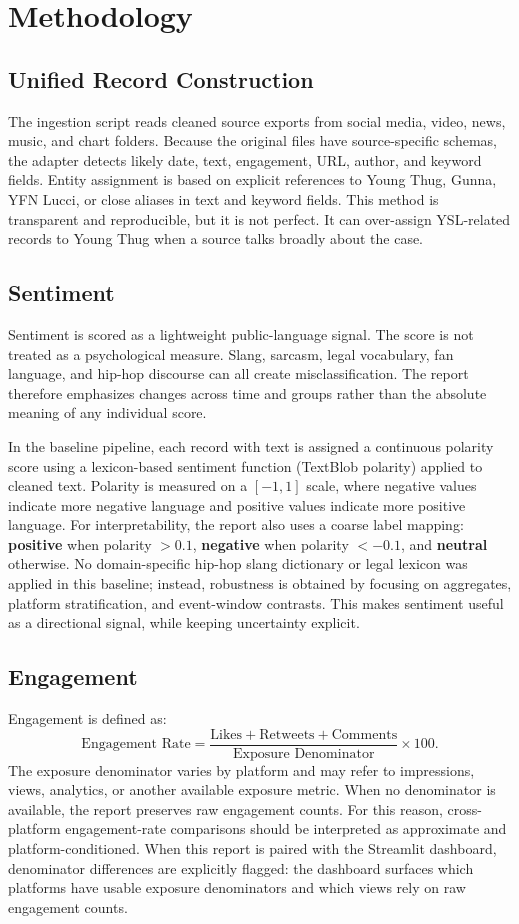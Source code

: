 \documentclass[12pt]{article}
\begin{document}
\section{Methodology}
\subsection{Unified Record Construction}
The ingestion script reads cleaned source exports from social media, video, news, music, and chart folders. Because the original files have source-specific schemas, the adapter detects likely date, text, engagement, URL, author, and keyword fields. Entity assignment is based on explicit references to Young Thug, Gunna, YFN Lucci, or close aliases in text and keyword fields. This method is transparent and reproducible, but it is not perfect. It can over-assign YSL-related records to Young Thug when a source talks broadly about the case.

\subsection{Sentiment}
Sentiment is scored as a lightweight public-language signal. The score is not treated as a psychological measure. Slang, sarcasm, legal vocabulary, fan language, and hip-hop discourse can all create misclassification. The report therefore emphasizes changes across time and groups rather than the absolute meaning of any individual score.

In the baseline pipeline, each record with text is assigned a continuous polarity score using a lexicon-based sentiment function (TextBlob polarity) applied to cleaned text. Polarity is measured on a \([-1, 1]\) scale, where negative values indicate more negative language and positive values indicate more positive language. For interpretability, the report also uses a coarse label mapping: \textbf{positive} when polarity \(> 0.1\), \textbf{negative} when polarity \(< -0.1\), and \textbf{neutral} otherwise. No domain-specific hip-hop slang dictionary or legal lexicon was applied in this baseline; instead, robustness is obtained by focusing on aggregates, platform stratification, and event-window contrasts. This makes sentiment useful as a directional signal, while keeping uncertainty explicit.

\subsection{Engagement}
Engagement is defined as:
\[
\text{Engagement Rate}
=
\frac{\text{Likes} + \text{Retweets} + \text{Comments}}
{\text{Exposure Denominator}}
\times 100.
\]
The exposure denominator varies by platform and may refer to impressions, views, analytics, or another available exposure metric. When no denominator is available, the report preserves raw engagement counts. For this reason, cross-platform engagement-rate comparisons should be interpreted as approximate and platform-conditioned.
When this report is paired with the Streamlit dashboard, denominator differences are explicitly flagged: the dashboard surfaces which platforms have usable exposure denominators and which views rely on raw engagement counts.
\end{document}
